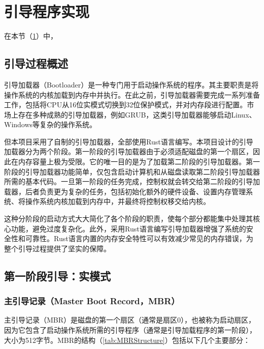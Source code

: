 \section{引导程序实现}\label{sec:BootloaderImplementation}

在本节（\cref{sec:BootloaderImplementation}）中，

\subsection{引导过程概述}

引导加载器（Bootloader）是一种专门用于启动操作系统的程序。其主要职责是将操作系统的内核加载到内存中并执行。在此之前，引导加载器需要完成一系列准备工作，包括将CPU从16位实模式切换到32位保护模式，并对内存段进行配置。市场上存在多种成熟的引导加载器，例如GRUB，这类引导加载器能够启动Linux、Windows等复杂的操作系统。

但本项目采用了自制的引导加载器，全部使用Rust语言编写。本项目设计的引导加载器分为两个阶段。第一阶段的引导加载器由于必须适配磁盘的第一个扇区，因此在内存容量上极为受限。它的唯一目的是为了加载第二阶段的引导加载器。第一阶段的引导加载器功能简单，仅包含启动计算机和从磁盘读取第二阶段引导加载器所需的基本代码。一旦第一阶段的任务完成，控制权就会转交给第二阶段的引导加载器，后者负责更为复杂的任务，包括初始化额外的硬件设备、设置内存管理系统、将操作系统内核加载到内存中，并最终将控制权移交给内核。

这种分阶段的启动方式大大简化了各个阶段的职责，使每个部分都能集中处理其核心功能，避免过度复杂化。此外，采用Rust语言编写引导加载器增强了系统的安全性和可靠性。Rust语言内置的内存安全特性可以有效减少常见的内存错误，为整个引导过程提供了坚实的保障。

\subsection{第一阶段引导：实模式}

\subsubsection{主引导记录（Master Boot Record，MBR）}

主引导记录（MBR）是磁盘的第一个扇区（通常是扇区0），也被称为启动扇区，因为它包含了启动操作系统所需的引导程序（通常是引导加载程序的第一阶段），大小为512字节。MBR的结构（\cref{tab:MBRStructure}）包括以下几个主要部分：

